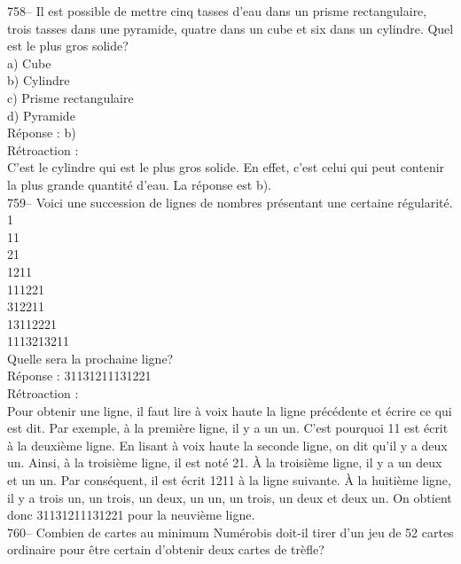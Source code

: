 ﻿\documentclass[letterpaper, 12pt]{article}
\begin{document}
758-- Il est possible de mettre cinq tasses d'eau dans un prisme
rectangulaire, trois tasses dans une pyramide, quatre dans un cube et six
dans un cylindre.  Quel est le plus gros solide?\\
a) Cube\\
b) Cylindre\\
c) Prisme rectangulaire\\
d) Pyramide\\

R\'eponse : b)\\

R\'etroaction : \\
C'est le cylindre qui est le plus gros solide. En effet, c'est celui qui
peut contenir la plus grande quantit\'e d'eau.  La r\'eponse est b).\\

759-- Voici une succession de lignes de nombres pr\'esentant une certaine
r\'egularit\'e.  \\
1\\
11\\
21\\
1211\\
111221\\
312211\\
13112221\\
1113213211\\

Quelle sera la prochaine ligne?\\

R\'eponse : 31131211131221\\

R\'etroaction : \\
Pour obtenir une ligne, il faut lire \`a voix haute la ligne pr\'ec\'edente
et \'ecrire ce qui est dit.  Par exemple, \`a la premi\`ere ligne, il y a un
un.  C'est pourquoi 11 est \'ecrit \`a la deuxi\`eme ligne. En lisant \`a
voix haute la seconde ligne, on dit qu'il y a deux un.  Ainsi, \`a la
troisi\`eme ligne, il est not\'e 21.  \`A la troisi\`eme ligne, il y a un
deux et un un.  Par cons\'equent, il est \'ecrit 1211 \`a la ligne suivante.
  \`A la huiti\`eme ligne, il y a trois un, un trois, un deux, un un, un
trois, un deux et deux un. On obtient donc 31131211131221 pour la neuvi\`eme
ligne.\\


760--  Combien de cartes au minimum Num\'erobis doit-il tirer d'un jeu de 52
cartes ordinaire pour \^etre certain d'obtenir deux cartes de tr\`efle?\\
\end{document}
